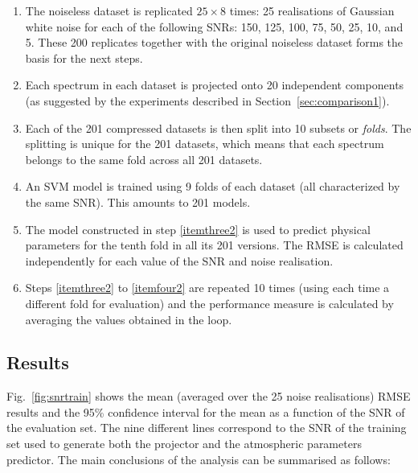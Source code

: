 \documentclass[a4paper,fleqn,usenatbib]{mnras}
\begin{document}
{{{\begin{enumerate}
\item The noiseless dataset is replicated $25\times 8$ times: 25
  realisations of Gaussian white noise for each of the following SNRs:
  150, 125, 100, 75, 50, 25, 10, and 5. These 200 replicates together
  with the original noiseless dataset forms the basis for the next
  steps.
\item Each spectrum in each dataset is projected onto 20 independent
  components (as suggested by the experiments described in
  Section~\ref{sec:comparison1}).
\item Each of the 201 compressed datasets is then split into 10
  subsets or \textit{folds}. The splitting is unique for the 201
  datasets, which means that each spectrum belongs to the same fold
  across all 201 datasets.
\item \label{itemthree2} An SVM model is trained using 9 folds of each
  dataset (all characterized by the same SNR). This amounts to 201
  models.
\item \label{itemfour2} The model constructed in step \ref{itemthree2}
  is used to predict physical parameters for the tenth fold in all its
  201 versions. The RMSE is calculated independently for each value of
  the SNR and noise realisation.
\item \label{itemfive2} Steps \ref{itemthree2} to \ref{itemfour2} are
  repeated 10 times (using each time a different fold for evaluation)
  and the performance measure is calculated by averaging the values
  obtained in the loop.
\end{enumerate}

\subsection{Results}

Fig.~\ref{fig:snrtrain} shows the mean (averaged over the 25 noise
realisations) RMSE results and the 95\% confidence interval for the
mean as a function of the SNR of the evaluation set. The nine
different lines correspond to the SNR of the training set used to
generate both the projector and the atmospheric parameters predictor.
The main conclusions of the analysis can be summarised as follows:

}}}
\end{document}
